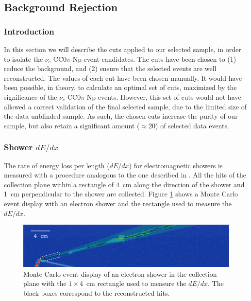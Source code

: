 \subsection{Background Rejection}\label{sec:bkg}
\subsubsection{Introduction}
In this section we will describe the cuts applied to our selected sample, in order to isolate the $\nu_{e}$ CC$0\pi$-Np event candidates. The cuts have been chosen to (1) reduce the background, and (2) ensure that the selected events are well reconstructed. The values of each cut have been chosen manually. It would have been possible, in theory, to calculate an optimal set of cuts, maximized by the significance of the $\nu_{e}$ CC0$\pi$-Np events. However, this set of cuts would not have allowed a correct validation of the final selected sample, due to the limited size of the data unblinded sample. As such, the chosen cuts increase the purity of our sample, but also retain a significant amount ($\approx 20$) of selected data events.

\subsubsection{Shower \texorpdfstring{$dE/dx$}{dE/dx}}\label{sec:dedx}
The rate of energy loss per length ($dE/dx$) for electromagnetic showers is measured with a procedure analogous to the one described in \cite{argoneut}. All the hits of the collection plane within a rectangle of 4~cm along the direction of the shower and 1~cm perpendicular to the shower are collected. Figure \ref{fig:evddedx} shows a Monte Carlo event display with an electron shower and the rectangle used to measure the $dE/dx$.

\begin{figure}[htbp]
\centering
  \includegraphics[width=0.9\linewidth]{figures/evddedx.png}
  \caption{Monte Carlo event display of an electron shower in the collection plane with the $1\times4$~cm rectangle used to measure the $dE/dx$. The black boxes correspond to the reconstructed hits.}
  \label{fig:evddedx}
\end{figure}

